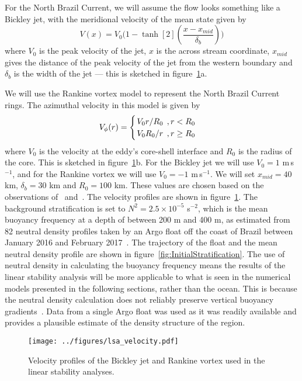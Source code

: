 For the North Brazil Current, we will assume the flow looks something like a Bickley jet, with the meridional velocity of the mean state given by
\begin{equation}
    V(x) = V_0 \Bigg( 1 - \tanh[2](\frac{x - x_{mid}}{\delta_b})\Bigg)
\end{equation}
where $V_0$ is the peak velocity of the jet, $x$ is the across stream coordinate, $x_{mid}$ gives the distance of the peak velocity of the jet from the western boundary and $\delta_b$ is the width of the jet --- this is sketched in figure~\ref{fig:InitialVelocity}a.

We will use the Rankine vortex model to represent the North Brazil Current rings. The azimuthal velocity in this model is given by
\begin{equation}
    V_{\phi}(r) = 
    \begin{cases}
        \flatfrac{V_0 r}{R_0} \, , r < R_0 \\
        \flatfrac{V_0 R_0}{r} \, , r \geq R_0
    \end{cases}
\end{equation}
where $V_0$ is the velocity at the eddy's core-shell interface and $R_0$ is the radius of the core. This is sketched in figure~\ref{fig:InitialVelocity}b. For the Bickley jet we will use $V_0 = 1$ m$\,$s$^{-1}$, and for the Rankine vortex we will use $V_0 = - 1$ m$\,$s$^{-1}$. We will set $x_{mid} = 40$ km, $\delta_b = 30$ km and $R_0 = 100$ km. These values are chosen based on the observations of~\citet{Johns1998} and~\citet{Castelao2011}. The velocity profiles are shown in figure~\ref{fig:InitialVelocity}. The background stratification is set to $N^2 = 2.5 \times 10^{-5}$ s$^{-2}$, which is the mean buoyancy frequency at a depth of between 200 m and 400 m, as estimated from 82 neutral density profiles taken by an Argo float off the coast of Brazil between January 2016 and February 2017~\citep{Argo2019}. The trajectory of the float and the mean neutral density profile are shown in figure~\ref{fig:InitialStratification}. The use of neutral density in calculating the buoyancy frequency means the results of the linear stability analysis will be more applicable to what is seen in the numerical models presented in the following sections, rather than the ocean. This is because the neutral density calculation does not reliably preserve vertical buoyancy gradients~\citep{Eden1999}. Data from a single Argo float was used as it was readily available and provides a plausible estimate of the density structure of the region.
\begin{figure}
    \centering
    \texttt{[image: ../figures/lsa\_velocity.pdf]}
    \caption{Velocity profiles of the Bickley jet and Rankine vortex used in the linear stability analyses.}
    \label{fig:InitialVelocity}
\end{figure}

